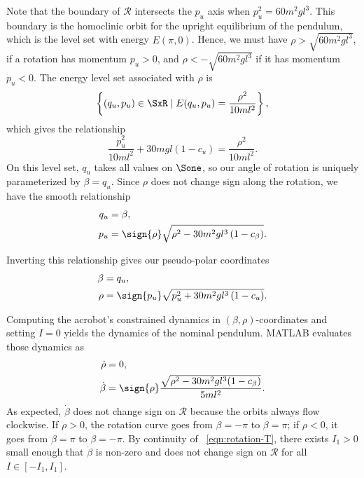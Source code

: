Note that the boundary of \(\mathcal{R}\) intersects the \(p_u\) axis when 
\(p_u^2 = 60m^2 g l^3\). 
This boundary is the homoclinic orbit for the
upright equilibrium of the pendulum, which is the level set with energy
\(E(\pi,0)\).
Hence, we must have \(\rho > \sqrt{60 m^2 g l^3}\), if a
rotation has momentum \(p_u > 0\), 
and \(\rho < -\sqrt{60 m^2 g l^3}\) if it has momentum \(p_u < 0\).
The energy level set associated with \(\rho\) is 
\[
    \left\{(q_u,p_u) \in \SxR \mid E(q_u,p_u) = \frac{\rho^2}{10ml^2}\right\}
    ,
\]
which gives the relationship
\begin{equation}\label{eqn:rotation-pu2}
    \frac{p_u^2}{10m l^2} + 30mgl(1 - c_u) = \frac{\rho^2}{10 ml^2}
    .
\end{equation}
On this level set, \(q_u\) takes all values on \(\Sone\), so our angle of
rotation is uniquely parameterized by \(\beta = q_u\).
Since \(\rho\) does not change sign along the rotation, we have the smooth
relationship
\begin{align}\label{eqn:rotation-Tinv}
    q_u &= \beta
    , \\
    p_u &= \sign{\rho}\sqrt{\rho^2 - 30 m^2 g l^3\left(1 - c_\beta \right)}
    .
\end{align}

Inverting this relationship gives our pseudo-polar coordinates
\begin{align}\label{eqn:rotation-T}
    \beta &= q_u
    , \\
    \rho &= \sign{p_u}\sqrt{p_u^2 + 30 m^2 g l^3 \left(1 - c_u \right)}
    .
\end{align}

Computing the acrobot's constrained dynamics in \((\beta,\rho)\)-coordinates and
setting \(I = 0\) yields the dynamics of the nominal pendulum.
MATLAB evaluates those dynamics as
\begin{align}\label{eqn:acrobot-rot-mu-dot-nom}
    \dot{\rho} &= 0
    , \\
    \label{eqn:acrobot-rot-alpha-dot-nom}
    \dot{\beta} &=  \sign{\rho} 
    \frac{\sqrt{\rho^2 - 30m^2gl^3(1 - c_\beta)}}{5ml^2}
    .
\end{align}
As expected, \(\dot{\beta}\) does not change sign on \(\mathcal{R}\) because the
orbits always flow clockwise.
If \(\rho > 0\), the rotation curve goes from \(\beta = -\pi\) to 
\(\beta = \pi\); 
if \(\rho < 0\), it goes from \(\beta = \pi\) to \(\beta = -\pi\).
By continuity of ~\eqref{eqn:rotation-T}, there exists \(I_1 > 0\) small enough
that \(\dot{\beta}\) is non-zero and does not change sign on \(\mathcal{R}\) for
all \(I \in [-I_1,I_1]\).

